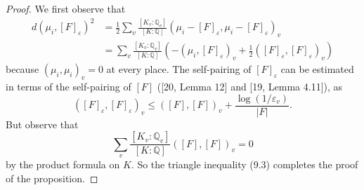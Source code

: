 \documentclass[10pt,a4paper]{amsart}
\numberwithin{equation}{section}
\theoremstyle{plain}
\theoremstyle{definition}
\theoremstyle{remark}
\newcommand{\Q}{\mathbb Q}
\begin{document}
\begin{proof}
We first observe that
\begin{align*}
d(\mu_i,[F]_{\varepsilon})^2&=\frac12\sum_v\frac{[K_v:\Q_v]}{[K:\Q]}(\mu_i-[F]_{\varepsilon},\mu_i-[F]_{\varepsilon})_v\\
&=\sum_v\frac{[K_v:\Q_v]}{[K:\Q]}\left(-(\mu_i,[F]_{\varepsilon})_v+\frac12([F]_{\varepsilon},[F]_{\varepsilon})_v\right)
\end{align*}
because $(\mu_i,\mu_i)_v=0$ at every place. The self-pairing of $[F]_{\varepsilon}$ can be estimated in terms of the self-pairing of $[F]$ ([20, Lemma 12] and [19, Lemma 4.11]), as
\[
([F]_{\varepsilon},[F]_{\varepsilon})_v\leq([F],[F])_v+\frac{\log(1/\varepsilon_v)}{|F|}.
\]
But observe that
\[
\sum_v\frac{[K_v:\Q_v]}{[K:\Q]}([F],[F])_v=0
\]
by the product formula on $K$. So the triangle inequality (9.3) completes the proof of the proposition.
\end{proof}
\end{document}
